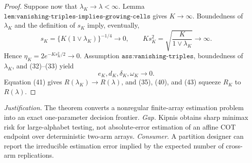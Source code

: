 \documentclass{article}
\begin{document}
\begin{proof}
Suppose now that \(\lambda_K\to\lambda<\infty\).
Lemma \(\texttt{lem:vanishing-triples-implies-growing-cells}\) gives
\(K\to\infty\).  Boundedness of \(\lambda_K\) and the definition of
\(s_K\) imply, eventually,
\[
 s_K=\{K(1\vee\lambda_K)\}^{-1/4}\to0,
 \qquad
 Ks_K^2=\sqrt{\frac{K}{1\vee\lambda_K}}\to\infty.
 \tag{42}
\]
Hence \(\eta_K=2e^{-Ks_K^2/2}\to0\).  Assumption
\(\texttt{ass:vanishing-triples}\), boundedness of \(\lambda_K\), and
(32)--(33) yield
\[
 e_K,d_K,\delta_K,\omega_K\longrightarrow0.
 \tag{43}
\]
Equation (41) gives \(R(\lambda_K)\to R(\lambda)\), and (35), (40), and
(43) squeeze \(R_K\) to \(R(\lambda)\).
\end{proof}
\par\smallskip\noindent \textit{Justification.} The theorem converts a nonregular finite-array estimation problem into an exact one-parameter decision frontier. \textit{Gap.} Kipnis obtains sharp minimax risk for large-alphabet testing, not absolute-error estimation of an affine COT endpoint over deterministic two-arm arrays. \textit{Consumer.} A partition designer can report the irreducible estimation error implied by the expected number of cross-arm replications.
\end{document}
